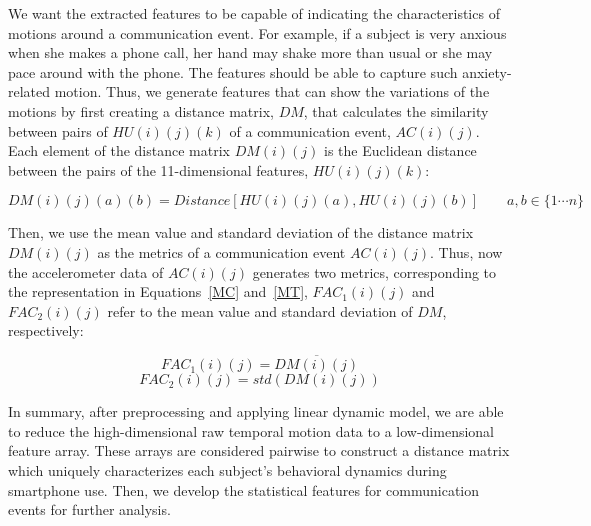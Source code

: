 We want the extracted features to be capable of indicating the characteristics of motions around a communication event. For example, if a subject is very anxious when she makes a phone call, her hand may shake more than usual or she may pace around with the phone.  The features should be able to capture such anxiety-related motion. Thus, we generate features that can show the variations of the motions by first creating a distance matrix, $DM$, that calculates the similarity between pairs of $HU(i)(j)(k)$ of a communication event, $AC(i)(j)$. Each element of the distance matrix $DM(i)(j)$ is the Euclidean distance between the pairs of the 11-dimensional features, $HU(i)(j)(k)$:

\begin{equation}
DM(i)(j)(a)(b)= Distance[HU(i)(j)(a), HU(i)(j)(b)] \qquad a,b \in \{1 \cdots n\}
\end{equation}

Then, we use the mean value and standard deviation of the distance matrix $DM(i)(j)$ as the metrics of a communication event  $AC(i)(j)$. 
Thus, now the accelerometer data of $AC(i)(j)$ generates two metrics, corresponding to the representation in Equations~\ref{MC} and~\ref{MT}, $FAC_1(i)(j)$ and $FAC_2(i)(j)$ refer to the mean value and standard deviation of $DM$, respectively:

\begin{equation}
FAC_1(i)(j)=\overline{DM(i)(j)}
\end{equation}
\begin{equation}
FAC_2(i)(j)=std(DM(i)(j))
\end{equation}

In summary, after preprocessing and applying linear dynamic model, we are able to reduce the high-dimensional raw temporal motion data to a low-dimensional feature array. These arrays are considered pairwise to construct a distance matrix which uniquely characterizes each subject's behavioral dynamics during smartphone use. Then, we develop the statistical features for communication events for further analysis.




